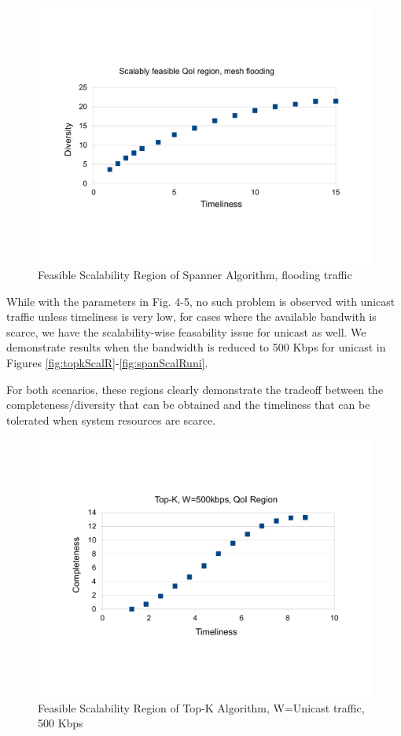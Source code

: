\begin{figure}
    \includegraphics[scale=0.35]{figures/spanRegfld.pdf}
    \caption{Feasible Scalability Region of Spanner Algorithm, flooding traffic}
    \label{fig:spanScalR}
\end{figure}


While with the parameters in Fig. 4-5, no such problem is observed with unicast traffic unless timeliness is very low, for cases where the available bandwith is scarce, we have the scalability-wise feasability issue for unicast as well. We demonstrate results when the bandwidth is reduced to 500 Kbps for unicast in Figures \ref{fig:topkScalR}-\ref{fig:spanScalRuni}.

For both scenarios, these regions clearly
demonstrate the tradeoff between the completeness/diversity
that can be obtained and the timeliness that can be tolerated when system resources are scarce. 

\begin{figure}
    \includegraphics[scale=0.35]{figures/topkReg500kuni.pdf}
    \caption{Feasible Scalability Region of Top-K Algorithm, W=Unicast traffic, 500 Kbps}
    \label{fig:topkScalRuni}
\end{figure}

